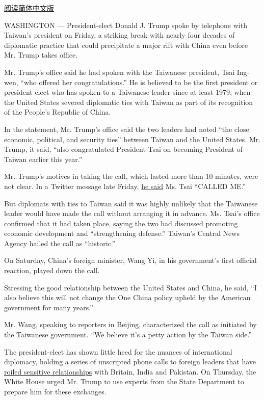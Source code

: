 \href{http://cn.nytimes.com/usa/20161203/trump-speaks-with-taiwans-leader-a-possible-affront-to-china/}{阅读简体中文版}

WASHINGTON --- President-elect Donald J. Trump spoke by telephone with
Taiwan's president on Friday, a striking break with nearly four decades
of diplomatic practice that could precipitate a major rift with China
even before Mr. Trump takes office.

Mr. Trump's office said he had spoken with the Taiwanese president, Tsai
Ing-wen, ``who offered her congratulations.'' He is believed to be the
first president or president-elect who has spoken to a Taiwanese leader
since at least 1979, when the United States severed diplomatic ties with
Taiwan as part of its recognition of the People's Republic of China.

In the statement, Mr. Trump's office said the two leaders had noted
``the close economic, political, and security ties'' between Taiwan and
the United States. Mr. Trump, it said, ``also congratulated President
Tsai on becoming President of Taiwan earlier this year.''

Mr. Trump's motives in taking the call, which lasted more than 10
minutes, were not clear. In a Twitter message late Friday,
\href{https://twitter.com/realDonaldTrump/status/804848711599882240}{he
said} Ms. Tsai ``CALLED ME.''

But diplomats with ties to Taiwan said it was highly unlikely that the
Taiwanese leader would have made the call without arranging it in
advance. Ms. Tsai's office
\href{http://www.president.gov.tw/Default.aspx?tabid=131\&itemid=38402\&rmid=514}{confirmed}
that it had taken place, saying the two had discussed promoting economic
development and ``strengthening defense.'' Taiwan's Central News Agency
hailed the call as ``historic.''

On Saturday, China's foreign minister, Wang Yi, in his government's
first official reaction, played down the call.

Stressing the good relationship between the United States and China, he
said, ``I also believe this will not change the One China policy upheld
by the American government for many years.''

Mr. Wang, speaking to reporters in Beijing, characterized the call as
initiated by the Taiwanese government. ``We believe it's a petty action
by the Taiwan side.''

The president-elect has shown little heed for the nuances of
international diplomacy, holding a series of unscripted phone calls to
foreign leaders that have
\href{http://www.nytimes.com/interactive/2016/12/02/world/trump-calls-to-world-leaders.html}{roiled
sensitive relationships} with Britain, India and Pakistan. On Thursday,
the White House urged Mr. Trump to use experts from the State Department
to prepare him for these exchanges.

